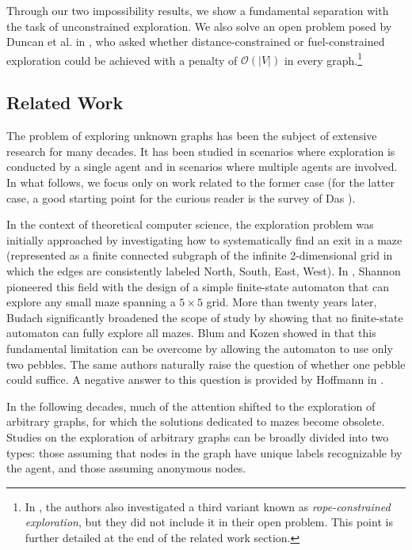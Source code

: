 \documentclass[11pt]{article}
\begin{document}
Through our two impossibility results, we show a fundamental
separation with the task of unconstrained exploration. We also solve
an open problem posed by Duncan et al. in \cite{DuncanKK06}, who asked
whether distance-constrained or fuel-constrained exploration could be
achieved with a penalty of $\mathcal{O}(|V|)$ in every
graph.\footnote{In \cite{DuncanKK06}, the authors also investigated a
third variant known as \emph{rope-constrained exploration}, but they
did not include it in their open problem. This point is further
detailed at the end of the related work section.}




\subsection{Related Work}

The problem of exploring unknown graphs has been the subject of
extensive research for many decades. It has been studied in scenarios
where exploration is conducted by a single agent and in scenarios
where multiple agents are involved. In what follows, we focus only on
work related to the former case (for the latter case, a good starting
point for the curious reader is the survey of Das \cite{Das19}).

In the context of theoretical computer science, the exploration problem was initially approached by investigating how to systematically find an exit in a maze (represented as a finite connected subgraph of the infinite 2-dimensional grid in which the edges are consistently labeled North, South, East, West). In \cite{Shannon51}, Shannon pioneered this field with the design of a simple finite-state automaton that can explore any small maze spanning a $5 \times 5$ grid. More than twenty years later, Budach \cite{Budach75} significantly broadened the scope of study by showing that no finite-state automaton can fully explore all mazes. Blum and Kozen showed in \cite{BlumK78} that this fundamental limitation can be overcome by allowing the automaton to use only two pebbles. The same authors naturally raise the question of whether one pebble could suffice. A negative answer to this question is provided by Hoffmann in \cite{Hoffmann81}.

In the following decades, much of the attention shifted to the exploration of arbitrary graphs, for which the solutions dedicated to mazes become obsolete. Studies on the exploration of arbitrary graphs can be broadly divided into two types: those assuming that nodes in the graph have unique labels recognizable by the agent, and those assuming anonymous nodes.
\end{document}
